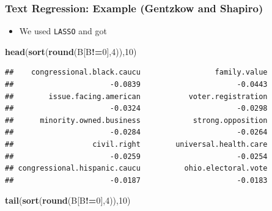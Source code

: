 \documentclass[
  shownotes,
  xcolor={svgnames},
  hyperref={colorlinks,citecolor=DarkBlue,linkcolor=DarkRed,urlcolor=DarkBlue}
  , aspectratio=169]{beamer}
\newenvironment{Shaded}{\begin{snugshade}}{\end{snugshade}}
\newcommand{\DecValTok}[1]{\textcolor[rgb]{0.00,0.00,0.81}{#1}}
\newcommand{\KeywordTok}[1]{\textcolor[rgb]{0.13,0.29,0.53}{\textbf{#1}}}
\newcommand{\NormalTok}[1]{#1}
\newcommand{\OperatorTok}[1]{\textcolor[rgb]{0.81,0.36,0.00}{\textbf{#1}}}
\begin{document}
\begin{frame}[fragile]
\frametitle{Text Regression: Example (Gentzkow and Shapiro)}

\begin{itemize}
  \item We used {\tt LASSO} and got
\end{itemize}
\begin{scriptsize}

\begin{Shaded}
\begin{Highlighting}[]
\KeywordTok{head}\NormalTok{(}\KeywordTok{sort}\NormalTok{(}\KeywordTok{round}\NormalTok{(B[B}\OperatorTok{!=}\DecValTok{0}\NormalTok{],}\DecValTok{4}\NormalTok{)),}\DecValTok{10}\NormalTok{)}
\end{Highlighting}
\end{Shaded}

\end{scriptsize}
\begin{tiny}


\begin{verbatim}
##    congressional.black.caucu                 family.value 
##                      -0.0839                      -0.0443 
##        issue.facing.american           voter.registration 
##                      -0.0324                      -0.0298 
##      minority.owned.business            strong.opposition 
##                      -0.0284                      -0.0264 
##                  civil.right        universal.health.care 
##                      -0.0259                      -0.0254 
## congressional.hispanic.caucu          ohio.electoral.vote 
##                      -0.0187                      -0.0183
\end{verbatim}
\end{tiny}

\begin{scriptsize}

\begin{Shaded}
\begin{Highlighting}[]
\KeywordTok{tail}\NormalTok{(}\KeywordTok{sort}\NormalTok{(}\KeywordTok{round}\NormalTok{(B[B}\OperatorTok{!=}\DecValTok{0}\NormalTok{],}\DecValTok{4}\NormalTok{)),}\DecValTok{10}\NormalTok{)}
\end{Highlighting}
\end{Shaded}

\end{scriptsize}
\begin{tiny}


\end{tiny}
\end{frame}
\end{document}
